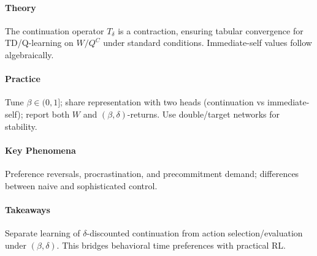 \paragraph{Theory}
The continuation operator $T_\delta$ is a contraction, ensuring tabular convergence for TD/Q-learning on $W/Q^C$ under standard conditions. Immediate-self values follow algebraically.

\paragraph{Practice}
Tune $\beta\in(0,1]$; share representation with two heads (continuation vs immediate-self); report both $W$ and $(\beta,\delta)$-returns. Use double/target networks for stability.

\paragraph{Key Phenomena}
Preference reversals, procrastination, and precommitment demand; differences between naive and sophisticated control.

\paragraph{Takeaways}
Separate learning of $\delta$-discounted continuation from action selection/evaluation under $(\beta,\delta)$. This bridges behavioral time preferences with practical RL.
